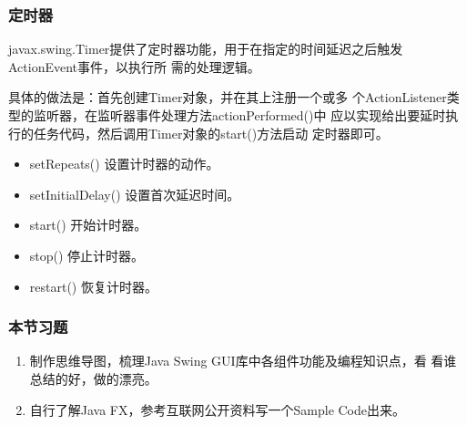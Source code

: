 \begin{frame}[fragile] %
\frametitle{定时器}

javax.swing.Timer提供了定时器功能，用于在指定的时间延迟之后触发ActionEvent事件，以执行所
需的处理逻辑。

{\kai 具体的做法是：首先创建Timer对象，并在其上注册一个或多
  个ActionListener类型的监听器，在监听器事件处理方法actionPerformed()中
  应以实现给出要延时执行的任务代码，然后调用Timer对象的start()方法启动
  定时器即可。}

\begin{itemize}
\item setRepeats() 设置计时器的动作。
\item setInitialDelay() 设置首次延迟时间。
\item start() 开始计时器。
\item stop() 停止计时器。
\item restart() 恢复计时器。
\end{itemize}
\end{frame}

\begin{frame}
  \frametitle{本节习题}
  \begin{enumerate}
  \item 制作思维导图，梳理Java Swing GUI库中各组件功能及编程知识点，看
    看谁总结的好，做的漂亮。
  \item 自行了解Java FX，参考互联网公开资料写一个Sample Code出来。
  \end{enumerate}
\end{frame}



